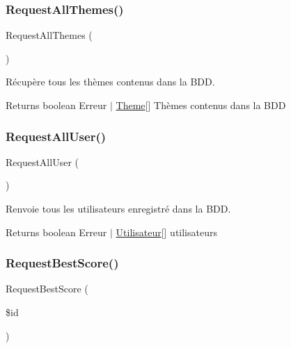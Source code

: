 \subsubsection{\texorpdfstring{Request\+All\+Themes()}{RequestAllThemes()}}
{\footnotesize\ttfamily Request\+All\+Themes (\begin{DoxyParamCaption}{ }\end{DoxyParamCaption})}



Récupère tous les thèmes contenus dans la B\+DD. 

\begin{DoxyReturn}{Returns}
boolean Erreur $\vert$ \mbox{\hyperlink{class_theme}{Theme}}\mbox{[}\mbox{]} Thèmes contenus dans la B\+DD 
\end{DoxyReturn}
\mbox{\label{class_interface_b_d_d_a3dea4aa280dafa70b190e859df68c1b4}} 
\subsubsection{\texorpdfstring{Request\+All\+User()}{RequestAllUser()}}
{\footnotesize\ttfamily Request\+All\+User (\begin{DoxyParamCaption}{ }\end{DoxyParamCaption})}



Renvoie tous les utilisateurs enregistré dans la B\+DD. 

\begin{DoxyReturn}{Returns}
boolean Erreur $\vert$ \mbox{\hyperlink{class_utilisateur}{Utilisateur}}\mbox{[}\mbox{]} utilisateurs 
\end{DoxyReturn}
\mbox{\label{class_interface_b_d_d_ac5d8ed61cc01eba73c0060a4561702dd}} 
\subsubsection{\texorpdfstring{Request\+Best\+Score()}{RequestBestScore()}}
{\footnotesize\ttfamily Request\+Best\+Score (\begin{DoxyParamCaption}\item[{}]{\$id }\end{DoxyParamCaption})}



